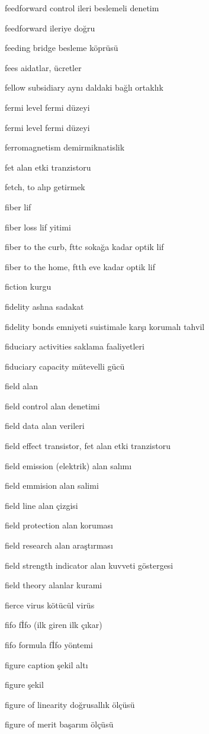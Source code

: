 \documentclass[12pt,fleqn]{article}\usepackage{../../common}
\begin{document}
feedforward control ileri beslemeli denetim

feedforward ileriye doğru

feeding bridge besleme köprüsü

fees aidatlar, ücretler

fellow subsidiary aynı daldaki bağlı ortaklık

fermi level fermi düzeyi

fermi level fermi düzeyi

ferromagnetism demirmiknatislik

fet alan etki tranzistoru

fetch, to alıp getirmek

fiber lif

fiber loss lif yitimi

fiber to the curb, fttc sokağa kadar optik lif

fiber to the home, ftth eve kadar optik lif

fiction kurgu

fidelity aslına sadakat

fidelity bonds emniyeti suistimale karşı korumalı tahvil

fiduciary activities saklama faaliyetleri

fiduciary capacity mütevelli gücü

field alan

field control alan denetimi

field data alan verileri

field effect transistor, fet alan etki tranzistoru

field emission (elektrik) alan salımı

field emmision alan salimi

field line alan çizgisi

field protection alan koruması

field research alan araştırması

field strength indicator alan kuvveti göstergesi

field theory alanlar kurami

fierce virus kötücül virüs

fifo fİfo (ilk giren ilk çıkar)

fifo formula fİfo yöntemi

figure caption şekil altı

figure şekil

figure of linearity doğrusallık ölçüsü

figure of merit başarım ölçüsü
\end{document}
